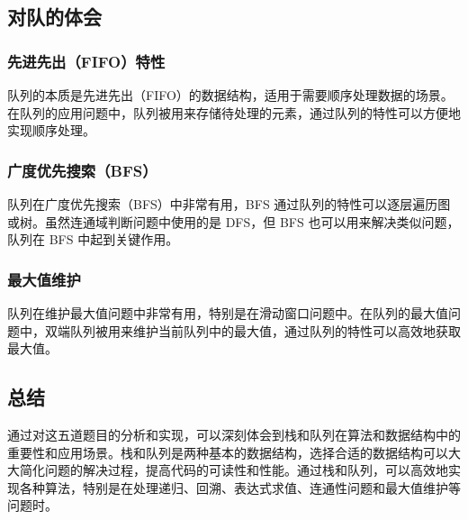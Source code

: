 \documentclass[12pt]{article}
\begin{document}
\subsection{对队的体会}
\subsubsection{先进先出（FIFO）特性}
{\songti 队列的本质是先进先出（FIFO）的数据结构，适用于需要顺序处理数据的场景。在队列的应用问题中，队列被用来存储待处理的元素，通过队列的特性可以方便地实现顺序处理。}
\subsubsection{广度优先搜索（BFS）}
{\songti 队列在广度优先搜索（BFS）中非常有用，BFS 通过队列的特性可以逐层遍历图或树。虽然连通域判断问题中使用的是 DFS，但 BFS 也可以用来解决类似问题，队列在 BFS 中起到关键作用。}
\subsubsection{最大值维护}
{\songti 队列在维护最大值问题中非常有用，特别是在滑动窗口问题中。在队列的最大值问题中，双端队列被用来维护当前队列中的最大值，通过队列的特性可以高效地获取最大值。}
\subsection{总结}
{\songti 通过对这五道题目的分析和实现，可以深刻体会到栈和队列在算法和数据结构中的重要性和应用场景。栈和队列是两种基本的数据结构，选择合适的数据结构可以大大简化问题的解决过程，提高代码的可读性和性能。通过栈和队列，可以高效地实现各种算法，特别是在处理递归、回溯、表达式求值、连通性问题和最大值维护等问题时。}
\end{document}
